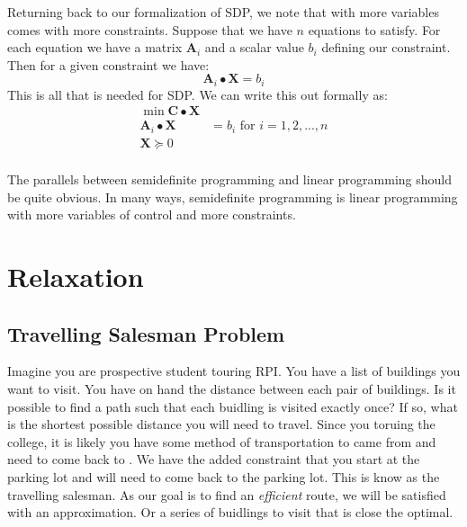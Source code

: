 \documentclass{article}
\begin{document}
Returning back to our formalization of SDP, we note that with more variables comes with more constraints. Suppose that we have \( n \) equations to satisfy. For each equation we have a matrix \( \mathbf{A}_i \) and a scalar value \( b_i \) defining our constraint. Then for a given constraint we have:
\[
\mathbf{A}_i \bullet \mathbf{X} = b_i
\]
This is all that is needed for SDP. We can write this out formally as:
\begin{align*}
  \min \mathbf{C} \bullet \mathbf{X} \\
  \mathbf{A}_i \bullet \mathbf{X} &= b_i  \text{   for } i = 1, 2, ..., n\\
  \mathbf{X} \succeq 0 \\
\end{align*}

The parallels between semidefinite programming and linear programming should be quite obvious.
In many ways, semidefinite programming is linear programming with more variables of control and more constraints.



\section{Relaxation}   %
\subsection{Travelling Salesman Problem} %
Imagine you are prospective student touring RPI. You have a list of buildings you want to visit.
You have on hand the distance between each pair of buildings. 
Is it possible to find a path such that each buidling is visited exactly once? 
If so, what is the shortest possible distance you will need to travel. 
Since you toruing the college, it is likely you have some method of transportation to came from and need to come back to . 
We have the added constraint that you start at the parking lot and will need to come back to the parking lot.
This is know as the travelling salesman.
As our goal is to find an \emph{efficient} route, we will be satisfied with an approximation. 
Or a series of buidlings to visit that is close the optimal.
\end{document}
